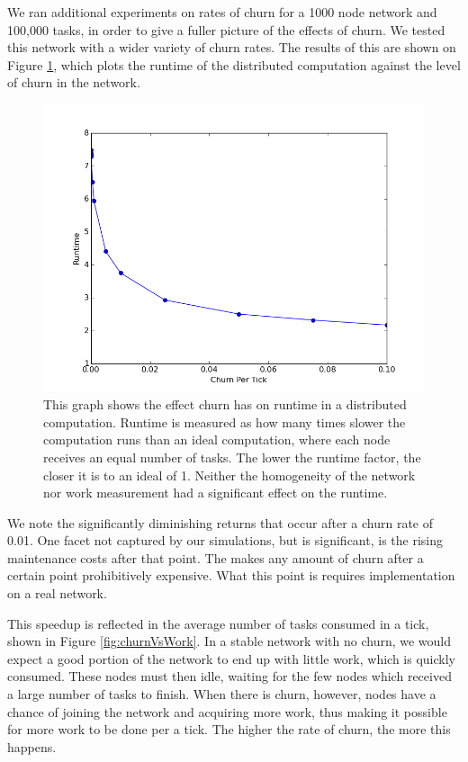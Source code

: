 We ran additional experiments on rates of churn for a 1000 node network and 100,000 tasks, in order to give a fuller picture of the effects of churn.
We tested this network with a wider variety of churn rates.
The results of this are shown on Figure \ref{fig:churnVsTime}, which plots the runtime of the distributed computation against the level of churn in the network.


\begin{figure}[h]
	\centering
	\includegraphics[width=0.7\linewidth]{figs/churnVsTime}
	\caption[Churn vs Runtime factor]{This graph shows the effect churn has on runtime in a distributed computation.
		Runtime is measured as how many times slower the computation runs than an ideal computation, where each node receives an equal number of tasks.
		The lower the runtime factor, the closer it is to an ideal of 1.
		Neither the homogeneity of the network nor work measurement had a significant effect on the runtime.}
	\label{fig:churnVsTime}
\end{figure}

We note the significantly diminishing returns that occur after a churn rate of 0.01.
One facet not captured by our simulations, but is significant, is the rising maintenance costs after that point.
The makes any amount of churn after a certain point prohibitively expensive.
What this point is requires implementation on a real network.

This speedup is reflected in the average number of tasks consumed in a tick, shown in Figure \ref{fig:churnVsWork}.
In a stable network with no churn, we would expect a good portion of the network to end up with little work, which is quickly consumed.
These nodes must then idle, waiting for the few nodes which received a large number of tasks to finish.
When there is churn, however, nodes have a chance of joining the network and acquiring more work, thus making it possible for more work to be done per a tick.
The higher the rate of churn, the more this happens.

